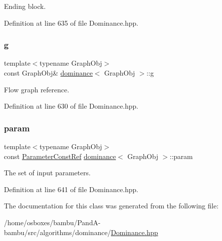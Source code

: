 Ending block. 



Definition at line 635 of file Dominance.\+hpp.

\mbox{\label{classdominance_ac30e4244fe4bf2383deb9a2ef623770e}} 
\subsubsection{\texorpdfstring{g}{g}}
{\footnotesize\ttfamily template$<$typename Graph\+Obj$>$ \\
const Graph\+Obj\& \hyperlink{classdominance}{dominance}$<$ Graph\+Obj $>$\+::g\hspace{0.3cm}{\ttfamily [private]}}



Flow graph reference. 



Definition at line 630 of file Dominance.\+hpp.

\mbox{\label{classdominance_add5c8ef2ac2e43d282fa5fbc552bfb5e}} 
\subsubsection{\texorpdfstring{param}{param}}
{\footnotesize\ttfamily template$<$typename Graph\+Obj$>$ \\
const \hyperlink{Parameter_8hpp_a37841774a6fcb479b597fdf8955eb4ea}{Parameter\+Const\+Ref} \hyperlink{classdominance}{dominance}$<$ Graph\+Obj $>$\+::param\hspace{0.3cm}{\ttfamily [private]}}



The set of input parameters. 



Definition at line 641 of file Dominance.\+hpp.



The documentation for this class was generated from the following file\+:\begin{DoxyCompactItemize}
\item 
/home/osboxes/bambu/\+Pand\+A-\/bambu/src/algorithms/dominance/\hyperlink{Dominance_8hpp}{Dominance.\+hpp}\end{DoxyCompactItemize}
